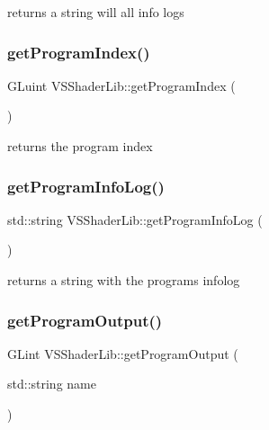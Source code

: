 returns a string will all info logs 

\mbox{\label{class_v_s_shader_lib_af57f630bc05ce6e3144229ae681b9f8d}} 
\subsubsection{\texorpdfstring{get\+Program\+Index()}{getProgramIndex()}}
{\footnotesize\ttfamily G\+Luint V\+S\+Shader\+Lib\+::get\+Program\+Index (\begin{DoxyParamCaption}{ }\end{DoxyParamCaption})}



returns the program index 

\mbox{\label{class_v_s_shader_lib_a1d201eb508747e8d223d9e2030af274b}} 
\subsubsection{\texorpdfstring{get\+Program\+Info\+Log()}{getProgramInfoLog()}}
{\footnotesize\ttfamily std\+::string V\+S\+Shader\+Lib\+::get\+Program\+Info\+Log (\begin{DoxyParamCaption}{ }\end{DoxyParamCaption})}



returns a string with the program\textquotesingle{}s infolog 

\mbox{\label{class_v_s_shader_lib_ae13982d7353dfb94442286d2dcac532f}} 
\subsubsection{\texorpdfstring{get\+Program\+Output()}{getProgramOutput()}}
{\footnotesize\ttfamily G\+Lint V\+S\+Shader\+Lib\+::get\+Program\+Output (\begin{DoxyParamCaption}\item[{std\+::string}]{name }\end{DoxyParamCaption})}

